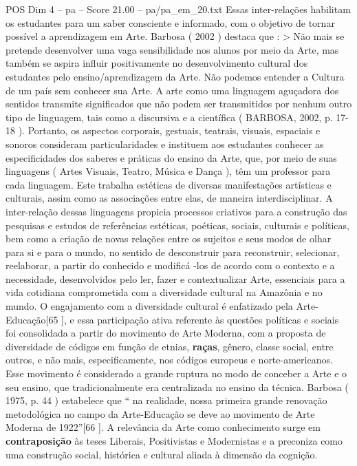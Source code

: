 \begin{textsample}{POS Dim 4 – pa – Score 21.00 – pa/pa\_em\_20.txt}
Essas inter-relações habilitam os estudantes para um saber consciente e informado, com o objetivo de tornar possível a aprendizagem em Arte.
Barbosa ( 2002 ) destaca que : > Não mais se pretende desenvolver uma vaga sensibilidade nos alunos por meio da Arte, mas também se aspira influir positivamente no desenvolvimento cultural dos estudantes pelo ensino/aprendizagem da Arte.
Não podemos entender a Cultura de um país sem conhecer sua Arte.
A arte como uma linguagem aguçadora dos sentidos transmite significados que não podem ser transmitidos por nenhum outro tipo de linguagem, tais como a discursiva e a científica ( BARBOSA, 2002, p. 17-18 ).
Portanto, os aspectos corporais, gestuais, teatrais, visuais, espaciais e sonoros consideram particularidades e instituem aos estudantes conhecer as especificidades dos saberes e práticas do ensino da Arte, que, por meio de suas linguagens ( Artes Visuais, Teatro, Música e Dança ), têm um professor para cada linguagem.
Este trabalha estéticas de diversas manifestações artísticas e culturais, assim como as associações entre elas, de maneira interdisciplinar.
A inter-relação dessas linguagens propicia processos criativos para a construção das pesquisas e estudos de referências estéticas, poéticas, sociais, culturais e políticas, bem como a criação de novas relações entre os sujeitos e seus modos de olhar para si e para o mundo, no sentido de desconstruir para reconstruir, selecionar, reelaborar, a partir do conhecido e modificá -los de acordo com o contexto e a necessidade, desenvolvidos pelo ler, fazer e contextualizar Arte, essenciais para a vida cotidiana comprometida com a diversidade cultural na Amazônia e no mundo.
O engajamento com a diversidade cultural é enfatizado pela Arte-Educação[65 ], e essa participação ativa referente às questões políticas e sociais foi consolidada a partir do movimento de Arte Moderna, com a proposta de diversidade de códigos em função de etnias, \textbf{raças}, gênero, classe social, entre outros, e não mais, especificamente, nos códigos europeus e norte-americanos.
Esse movimento é considerado a grande ruptura no modo de conceber a Arte e o seu ensino, que tradicionalmente era centralizada no ensino da técnica.
Barbosa ( 1975, p. 44 ) estabelece que “ na realidade, nossa primeira grande renovação metodológica no campo da Arte-Educação se deve ao movimento de Arte Moderna de 1922”[66 ].
A relevância da Arte como conhecimento surge em \textbf{contraposição} às teses Liberais, Positivistas e Modernistas e a preconiza como uma construção social, histórica e cultural aliada à dimensão da cognição.

\end{textsample}
